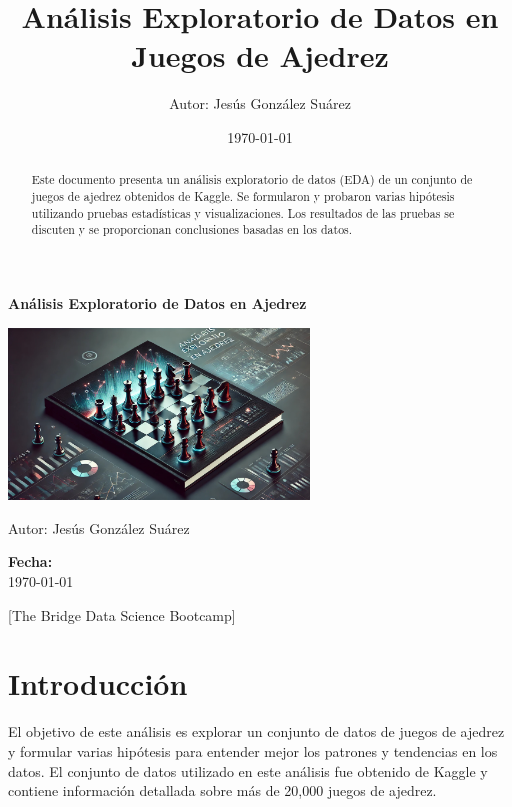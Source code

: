 \documentclass[a4paper, 12pt]{article}
\title{Análisis Exploratorio de Datos en Juegos de Ajedrez}
\author{Autor: Jesús González Suárez}
\date{\today}
\begin{document}
\begin{titlepage}
    \centering
    \vspace*{1in}
    
    \huge
    \textbf{Análisis Exploratorio de Datos en Ajedrez}
    
    \vspace{0.5in}
    
    \includegraphics[width=0.6\textwidth]{../Imagenes/Imagen1.jpeg} %
    
    \vspace{0.5in}
    
    \Large
    Autor: Jesús González Suárez
    
    \vspace{0.5in}
    
    \large
    \textbf{Fecha:} \\
    \today
    
    \vfill
    
    \large
    [The Bridge Data Science Bootcamp]
    
\end{titlepage}

\tableofcontents
\listoffigures
\listoftables

\maketitle

\begin{abstract}
Este documento presenta un análisis exploratorio de datos (EDA) de un conjunto de juegos de ajedrez obtenidos de Kaggle. Se formularon y probaron varias hipótesis utilizando pruebas estadísticas y visualizaciones. Los resultados de las pruebas se discuten y se proporcionan conclusiones basadas en los datos.
\end{abstract}

\section{Introducción}
El objetivo de este análisis es explorar un conjunto de datos de juegos de ajedrez y formular varias hipótesis para entender mejor los patrones y tendencias en los datos. El conjunto de datos utilizado en este análisis fue obtenido de Kaggle y contiene información detallada sobre más de 20,000 juegos de ajedrez.
\end{document}
